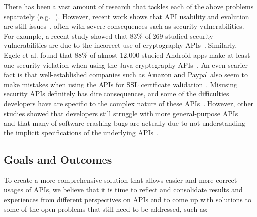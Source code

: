 \documentclass[10pt, conference]{IEEEtran}
\begin{document}
There has been a vast amount of research that tackles each of the above problems separately (e.g.,~\cite{Subramanian:2014,RobillardInferenceSurvey,RobillardLearn09, NNP+09, ThungLibRec}). However, recent work shows that API usability and evolution are still issues~\cite{NKMB16, BKHT:FSE16, SunshineAPIProtocol}, often with severe consequences such as security vulnerabilities. For example, a recent study showed that 83\% of 269 studied security vulnerabilities are due to the incorrect use of cryptography APIs~\cite{Lazar2014}. Similarly, Egele et al. found that 88\% of almost 12,000 studied Android apps make at least one security violation when using the Java cryptography APIs~\cite{EgeleBFK13}. An even scarier fact is that well-established companies such as Amazon and Paypal also seem to make mistakes when using the APIs for SSL certificate validation~\cite{GeorgievIJABS12}. Misusing security APIs definitely has dire consequences, and some of the difficulties developers have are specific to the complex nature of these APIs~\cite{NKMB16}. However, other studies showed that developers still struggle with more general-purpose APIs~\cite{SunshineAPIProtocol} and that many of software-crashing bugs are actually due to not understanding the implicit specifications of the underlying APIs~\cite{amani2016mubench}.

\subsection{Goals and Outcomes}
\label{sec:goals}
To create a more comprehensive solution that allows easier and more correct usages of APIs, we believe that it is time to reflect and consolidate results and experiences from different perspectives on APIs and to come up with solutions to some of the open problems that still need to be addressed, such as:
\end{document}
